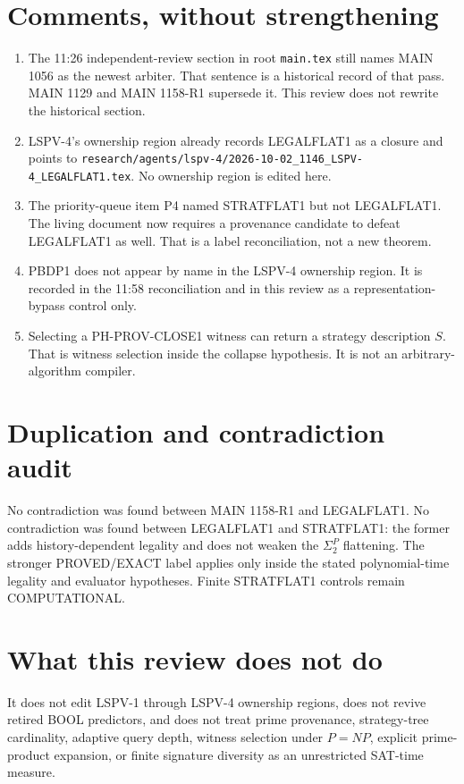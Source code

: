 \documentclass[11pt]{article}
\begin{document}
\section*{Comments, without strengthening}
\begin{enumerate}
\item The 11:26 independent-review section in root \texttt{main.tex} still names MAIN 1056
as the newest arbiter. That sentence is a historical record of that pass. MAIN 1129 and
MAIN 1158-R1 supersede it. This review does not rewrite the historical section.
\item LSPV-4's ownership region already records LEGALFLAT1 as a closure and points to
\texttt{research/agents/lspv-4/2026-10-02\_1146\_LSPV-4\_LEGALFLAT1.tex}. No ownership
region is edited here.
\item The priority-queue item P4 named STRATFLAT1 but not LEGALFLAT1. The living document
now requires a provenance candidate to defeat LEGALFLAT1 as well. That is a label
reconciliation, not a new theorem.
\item PBDP1 does not appear by name in the LSPV-4 ownership region. It is recorded in the
11:58 reconciliation and in this review as a representation-bypass control only.
\item Selecting a PH-PROV-CLOSE1 witness can return a strategy description \(S\). That is
witness selection inside the collapse hypothesis. It is not an arbitrary-algorithm compiler.
\end{enumerate}

\section*{Duplication and contradiction audit}
No contradiction was found between MAIN 1158-R1 and LEGALFLAT1. No contradiction was found
between LEGALFLAT1 and STRATFLAT1: the former adds history-dependent legality and does not
weaken the \(\Sigma_2^P\) flattening. The stronger PROVED/EXACT label applies only inside
the stated polynomial-time legality and evaluator hypotheses. Finite STRATFLAT1 controls
remain COMPUTATIONAL.

\section*{What this review does not do}
It does not edit LSPV-1 through LSPV-4 ownership regions, does not revive retired BOOL
predictors, and does not treat prime provenance, strategy-tree cardinality, adaptive query
depth, witness selection under \(P=NP\), explicit prime-product expansion, or finite
signature diversity as an unrestricted SAT-time measure.
\end{document}
